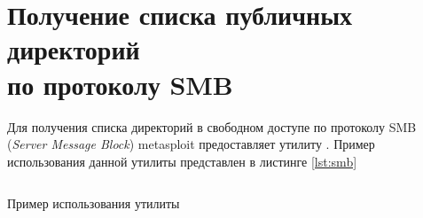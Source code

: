 \section{Получение списка публичных директорий \\ по протоколу SMB}

Для получения списка директорий в свободном доступе по протоколу SMB (\emph{Server Message Block}) metasploit предоставляет утилиту .
Пример использования данной утилиты представлен в листинге \ref{lst:smb}

\begin{listing}[H]
    \inputminted{console}{resources/smb/00_smb}
    \caption{Пример использования утилиты }
    \label{lst:smb}
\end{listing}